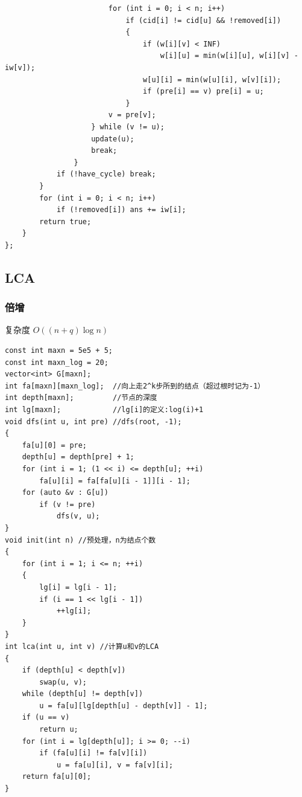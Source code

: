 \documentclass[twoside]{article}
\begin{document}
\begin{lstlisting}
                        for (int i = 0; i < n; i++)
                            if (cid[i] != cid[u] && !removed[i])
                            {
                                if (w[i][v] < INF)
                                    w[i][u] = min(w[i][u], w[i][v] - iw[v]);
                                w[u][i] = min(w[u][i], w[v][i]);
                                if (pre[i] == v) pre[i] = u;
                            }
                        v = pre[v];
                    } while (v != u);
                    update(u);
                    break;
                }
            if (!have_cycle) break;
        }
        for (int i = 0; i < n; i++)
            if (!removed[i]) ans += iw[i];
        return true;
    }
};
\end{lstlisting}
\subsection{LCA}
\subsubsection{倍增}
复杂度 $O((n+q) \log n)$
\begin{lstlisting}
const int maxn = 5e5 + 5;
const int maxn_log = 20;
vector<int> G[maxn];
int fa[maxn][maxn_log];  //向上走2^k步所到的结点（超过根时记为-1）
int depth[maxn];         //节点的深度
int lg[maxn];            //lg[i]的定义:log(i)+1
void dfs(int u, int pre) //dfs(root, -1);
{
    fa[u][0] = pre;
    depth[u] = depth[pre] + 1;
    for (int i = 1; (1 << i) <= depth[u]; ++i)
        fa[u][i] = fa[fa[u][i - 1]][i - 1];
    for (auto &v : G[u])
        if (v != pre)
            dfs(v, u);
}
void init(int n) //预处理，n为结点个数
{
    for (int i = 1; i <= n; ++i)
    {
        lg[i] = lg[i - 1];
        if (i == 1 << lg[i - 1])
            ++lg[i];
    }
}
int lca(int u, int v) //计算u和v的LCA
{
    if (depth[u] < depth[v])
        swap(u, v);
    while (depth[u] != depth[v])
        u = fa[u][lg[depth[u] - depth[v]] - 1];
    if (u == v)
        return u;
    for (int i = lg[depth[u]]; i >= 0; --i)
        if (fa[u][i] != fa[v][i])
            u = fa[u][i], v = fa[v][i];
    return fa[u][0];
}
\end{lstlisting}
\end{document}
